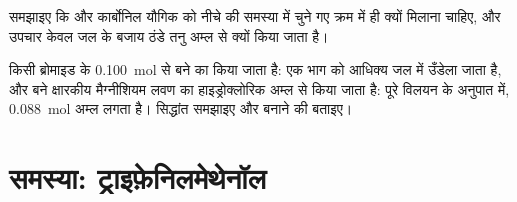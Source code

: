 \begin{exercise}[$\star\star\star$]\label{exo:b1:organomagnesium:11}
समझाइए कि  और कार्बोनिल यौगिक को नीचे की
समस्या में चुने गए क्रम में ही क्यों मिलाना चाहिए, और उपचार केवल जल के बजाय
ठंडे तनु अम्ल से क्यों किया जाता है।
\end{exercise}

\begin{exercise}[$\star\star\star$]\label{exo:b1:organomagnesium:12}
किसी ब्रोमाइड के \qty{0.100}{mol} से बने  का  किया जाता है:
एक भाग को आधिक्य जल में उँडेला जाता है, और बने क्षारकीय मैग्नीशियम लवण का
हाइड्रोक्लोरिक अम्ल से  किया जाता है: पूरे विलयन के अनुपात में,
\qty{0.088}{mol} अम्ल लगता है। सिद्धांत समझाइए और बनाने की 
बताइए।
\end{exercise}

\section{समस्या: ट्राइफ़ेनिलमेथेनॉल}


